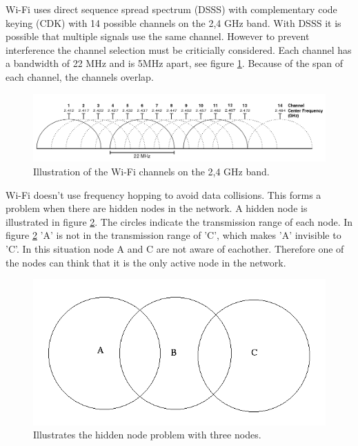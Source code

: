\documentclass[10pt,a4paper]{article}
\begin{document}
Wi-Fi uses direct sequence spread spectrum (DSSS) with complementary code keying (CDK) with 14 possible channels on the 2,4 GHz band. With DSSS it is possible that multiple signals use the same channel. However to prevent interference the channel selection must be criticially considered. Each channel has a bandwidth of 22 MHz and is 5MHz apart, see figure \ref{fig:wifichannels}. \cite{combook} Because of the span of each channel, the channels overlap.

\begin{figure}[H]
   \centering
   \includegraphics[width=1\textwidth]{wifichannels}
   \caption{Illustration of the Wi-Fi channels on the 2,4 GHz band. \cite{wifichannels}}
   \label{fig:wifichannels}
\end{figure}

Wi-Fi doesn't use frequency hopping to avoid data collisions. This forms a problem when there are hidden nodes in the network. A hidden node is illustrated in figure \ref{fig:hiddennode}. The circles indicate the transmission range of each node. In figure \ref{fig:hiddennode} 'A' is not in the transmission range of 'C', which makes 'A' invisible to 'C'. In this situation node A and C are not aware of eachother. Therefore one of the nodes can think that it is the only active node in the network.

\begin{figure}[H]
   \centering
   \includegraphics[width=1\textwidth]{hiddennodeproblem}
   \caption{Illustrates the hidden node problem with three nodes.}
   \label{fig:hiddennode}
\end{figure}
\end{document}
